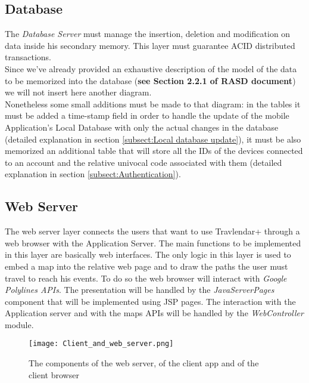 \subsection{Database}
\label{subsect:Database}
	The \textit{Database Server} must manage the insertion, deletion and modification on data inside his secondary memory. This layer must guarantee ACID distributed transactions.\\
	Since we've already provided an exhaustive description of the model of the data to be memorized into the database (\textbf{see Section 2.2.1 of RASD document}) we will not insert here another diagram.\\
	Nonetheless some small additions must be made to that diagram: in the tables it must be added a time-stamp field in order to handle the update of the mobile Application's Local Database with only the actual changes in the database (detailed explanation in section \ref{subsect:Local database update}), it must be also memorized an additional table that will store all the IDs of the devices connected to an account and the relative univocal code associated with them (detailed explanation in section \ref{subsect:Authentication}).	

\subsection{Web Server}
\label{subsect:Web Server}
	The web server layer connects the users that want to use Travlendar+ through a web browser with the Application Server. \newline
	The main functions to be implemented in this layer are basically web interfaces.
	The only logic in this layer is used to embed a map into the relative web page and to draw the paths the user must travel to reach his events. To do so the web browser will interact with\textit{ Google Polylines APIs}.
	The presentation will be handled by the \textit{JavaServerPages} component that will be implemented using JSP pages. The interaction with the Application server and with the maps APIs will be handled by the \textit{WebController} module.
	
\begin{figure}[H]
\begin{center}
		\hspace*{-0pt}
		\texttt{[image: Client\_and\_web\_server.png]}
\end{center}
\caption{The components of the web server, of the client app and of the client browser}
\end{figure}

